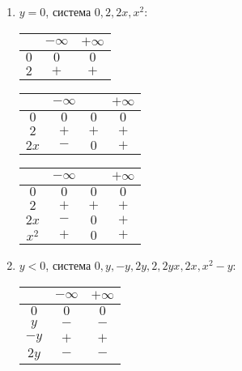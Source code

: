 \begin{enumerate}
    \item $y = 0$, система $0, 2, 2x, x^2$:
    \begin{center}
        \begin{tabular}{|c|c|c|}
            \hline
             & $-\infty$ & $+\infty$\\
            \hline
            $0$ & $0$ & $0$\\
            \hline
            $2$ & $+$ & $+$\\
            \hline
        \end{tabular} 
            \quad
        \begin{tabular}{|c|c|c|c|}
            \hline
             & $-\infty$ & & $+\infty$\\
            \hline
            $0$ & $0$ & $0$ & $0$\\
            \hline
            $2$ & $+$ & $+$ & $+$\\
            \hline
            $2x$ & $-$ & $0$ & $+$\\
            \hline
        \end{tabular}
            \quad
        \begin{tabular}{|c|c|c|c|}
            \hline
             & $-\infty$ & & $+\infty$\\
            \hline
            $0$ & $0$ & $0$ & $0$\\
            \hline
            $2$ & $+$ & $+$ & $+$\\
            \hline
            $2x$ & $-$ & $0$ & $+$\\
            \hline
            $x^2$ & $+$ & $0$ & $+$\\
            \hline
        \end{tabular}         
    \end{center}
    \item $y < 0$, система $0, y, -y, 2y, 2, 2yx, 2x, x^2 - y$:
    \begin{center}
        \begin{tabular}{|c|c|c|}
            \hline
             & $-\infty$ & $+\infty$\\
            \hline
            $0$ & $0$ & $0$\\
            \hline
            $y$ & $-$ & $-$\\
            \hline
            $-y$ & $+$ & $+$\\
            \hline
            $2y$ & $-$ & $-$\\

\end{tabular}
\end{center}
\end{enumerate}
